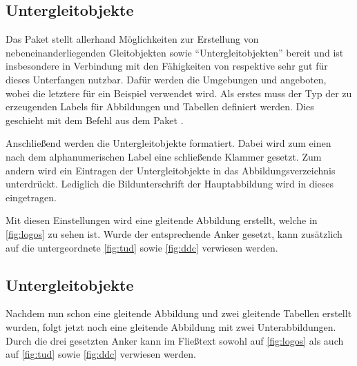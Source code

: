 \documentclass[%
  english,ngerman,%
  cdgeometry=no,DIV=12,automark,%
]{tudscrartcl}
\begin{document}
\begin{table}
\end{table}


\subsection{Untergleitobjekte}
\label{sec:subfloats}
Das Paket  stellt allerhand Möglichkeiten zur Erstellung von 
nebeneinanderliegenden Gleitobjekten sowie \enquote{Untergleitobjekten} bereit 
und ist insbesondere in Verbindung mit den Fähigkeiten von  
respektive  sehr gut für dieses Unterfangen nutzbar. Dafür 
werden die Umgebungen  und  
angeboten, wobei die letztere für ein Beispiel verwendet wird. Als erstes muss 
der Typ der zu erzeugenden Labels für Abbildungen und Tabellen definiert 
werden. Dies geschieht mit dem Befehl  aus dem 
Paket .
%
\begin{Preamble}
\end{Preamble}
%
Anschließend werden die Untergleitobjekte formatiert. Dabei wird zum einen nach 
dem alphanumerischen Label eine schließende Klammer gesetzt. Zum andern wird 
ein Eintragen der Untergleitobjekte in das Abbildungsverzeichnis unterdrückt. 
Lediglich die Bildunterschrift der Hauptabbildung wird in dieses eingetragen.
%
\begin{Preamble*}
\captionsetup[subfloat]{labelformat=brace,list=off}

\end{Preamble*}
%
Mit diesen Einstellungen wird eine gleitende Abbildung erstellt, welche in 
\autoref{fig:logos} zu sehen ist. Wurde der entsprechende Anker gesetzt, kann 
zusätzlich auf die untergeordnete \autoref{fig:tud} sowie \autoref{fig:ddc} 
verwiesen werden.
%
\begin{Trunk+}
\subsection{Untergleitobjekte}
Nachdem nun schon eine gleitende Abbildung und zwei gleitende Tabellen 
erstellt wurden, folgt jetzt noch eine gleitende Abbildung mit zwei 
Unterabbildungen. Durch die drei gesetzten Anker kann im Fließtext 
sowohl auf \autoref{fig:logos} als auch auf \autoref{fig:tud} sowie 
\autoref{fig:ddc} verwiesen werden.

\end{Trunk+}
\end{document}
